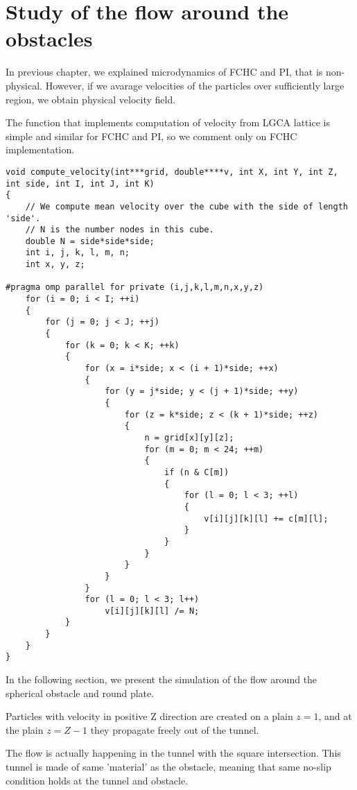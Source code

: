 \chapter{Study of the flow around the obstacles}

In previous chapter, we explained microdynamics of FCHC and PI, that is non-physical.
However, if we avarage velocities of the particles over sufficiently large region, we obtain physical velocity field.


The function that implements computation of velocity from LGCA lattice is simple and similar for FCHC and PI, so we comment only on FCHC implementation.

\begin{lstlisting}
void compute_velocity(int***grid, double****v, int X, int Y, int Z, int side, int I, int J, int K)
{
	// We compute mean velocity over the cube with the side of length 'side'.
	// N is the number nodes in this cube.
	double N = side*side*side;
	int i, j, k, l, m, n;
	int x, y, z;

#pragma omp parallel for private (i,j,k,l,m,n,x,y,z)
	for (i = 0; i < I; ++i)
	{
		for (j = 0; j < J; ++j)
		{
			for (k = 0; k < K; ++k)
			{
				for (x = i*side; x < (i + 1)*side; ++x)
				{
					for (y = j*side; y < (j + 1)*side; ++y)
					{
						for (z = k*side; z < (k + 1)*side; ++z)
						{
							n = grid[x][y][z];
							for (m = 0; m < 24; ++m)
							{
								if (n & C[m])
								{
									for (l = 0; l < 3; ++l)
									{
										v[i][j][k][l] += c[m][l];
									}
								}
							}
						}
					}
				}
				for (l = 0; l < 3; l++)
					v[i][j][k][l] /= N;
			}
		}
	}
}
\end{lstlisting}

In the following section, we present the simulation of the flow around the spherical obstacle and round plate.

\bigskip

Particles with velocity in positive Z direction are created on a plain $z=1$, and at the plain $z = Z - 1$ they propagate freely out of the tunnel. 

The flow is actually happening in the tunnel with the square intersection. This tunnel is made of same 'material' as the obstacle, meaning that same no-slip condition holds at the tunnel and obstacle.

